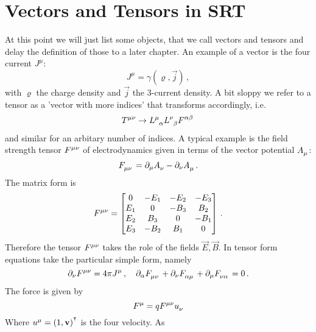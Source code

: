 \section{Vectors and Tensors in SRT}
At this point we will just list some objects, that we call vectors and tensors
and delay the definition of those to a later chapter.
An example of a vector is the four current $J^\mu$:
\begin{equation}
    J^\mu=\gamma(\varrho,\vec{j})\, ,
\end{equation}
with $\varrho$ the charge density and $\vec{j}$ the 3-current density. A bit sloppy
we refer to a tensor as a 'vector with more indices' that transforms
accordingly, i.e.
\begin{equation}
    \tensor{T}{^\mu^\nu}\to
    \tensor{L}{^\mu_\alpha}\tensor{L}{^\nu_\beta}\tensor{F}{^\alpha^\beta}\,
\end{equation}
and similar for an arbitary number of indices. A typical example is the field strength tensor
$\tensor{F}{^\mu^\nu}$ of electrodynamics given in terms of the
vector potential $\tensor{A}{_\mu}$:
\begin{equation}
    \tensor{F}{_\mu_\nu}=\partial_\mu\tensor{A}{_\nu}-\partial_\nu\tensor{A}{_\mu}\,.
\end{equation}
The matrix form is
\begin{equation}
    \tensor{F}{^\mu^\nu}=
    \begin{bmatrix}
        0  &   -E_1 &  -E_2 &  -E_3 \\
        E_1 &   0  &  -B_3 & B_2 \\
        E_2 & B_3 &   0  &  -B_1 \\
        E_3 &  -B_2 & B_1 &   0  \\
    \end{bmatrix}\, .
\end{equation}
Therefore the tensor $\tensor{F}{^\mu^\nu}$ takes the role of the fields
$\vec{E},\vec{B}$. In tensor form  equations take the particular
simple form, namely
\begin{equation}
    \partial_\nu\tensor{F}{^\mu^\nu}=4\pi\tensor{J}{^\mu}\,, \quad
    \partial_\alpha\tensor{F}{_\mu_\nu}
    +\partial_\nu\tensor{F}{_\alpha_\mu}
    +\partial_\mu\tensor{F}{_\nu_\alpha}=0\,.
\end{equation}
The  force is given by
\begin{equation}
    \tensor{F}{^\mu}=q\tensor{F}{^\mu^\nu}\tensor{u}{_\nu}
\end{equation}
Where $\tensor{u}{^\mu}=(1,\vec{v})\transpose$ is the four velocity. As
